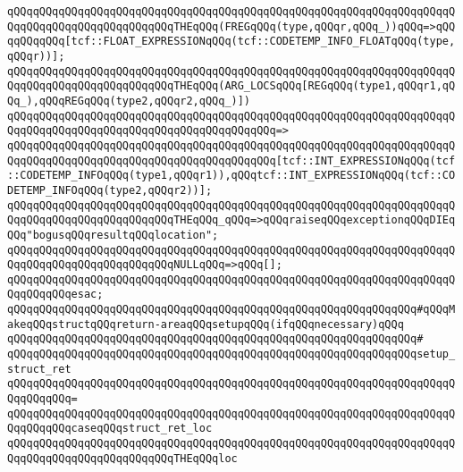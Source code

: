 \verb|qQQqqQQqqQQqqQQqqQQqqQQqqQQqqQQqqQQqqQQqqQQqqQQqqQQqqQQqqQQqqQQqqQQqqQQqqQQqqQQqqQQqqQQqqQQqqQQqTHEqQQq(FREGqQQq(type,qQQqr,qQQq_))qQQq=>qQQqqQQqqQQq[tcf::FLOAT_EXPRESSIONqQQq(tcf::CODETEMP_INFO_FLOATqQQq(type,qQQqr))];|\newline
\newline
\verb|qQQqqQQqqQQqqQQqqQQqqQQqqQQqqQQqqQQqqQQqqQQqqQQqqQQqqQQqqQQqqQQqqQQqqQQqqQQqqQQqqQQqqQQqqQQqqQQqTHEqQQq(ARG_LOCSqQQq[REGqQQq(type1,qQQqr1,qQQq_),qQQqREGqQQq(type2,qQQqr2,qQQq_)])|\newline
\verb|qQQqqQQqqQQqqQQqqQQqqQQqqQQqqQQqqQQqqQQqqQQqqQQqqQQqqQQqqQQqqQQqqQQqqQQqqQQqqQQqqQQqqQQqqQQqqQQqqQQqqQQqqQQqqQQq=>|\newline
\verb|qQQqqQQqqQQqqQQqqQQqqQQqqQQqqQQqqQQqqQQqqQQqqQQqqQQqqQQqqQQqqQQqqQQqqQQqqQQqqQQqqQQqqQQqqQQqqQQqqQQqqQQqqQQqqQQq[tcf::INT_EXPRESSIONqQQq(tcf::CODETEMP_INFOqQQq(type1,qQQqr1)),qQQqtcf::INT_EXPRESSIONqQQq(tcf::CODETEMP_INFOqQQq(type2,qQQqr2))];|\newline
\newline
\verb|qQQqqQQqqQQqqQQqqQQqqQQqqQQqqQQqqQQqqQQqqQQqqQQqqQQqqQQqqQQqqQQqqQQqqQQqqQQqqQQqqQQqqQQqqQQqqQQqTHEqQQq_qQQq=>qQQqraiseqQQqexceptionqQQqDIEqQQq"bogusqQQqresultqQQqlocation";|\newline
\newline
\verb|qQQqqQQqqQQqqQQqqQQqqQQqqQQqqQQqqQQqqQQqqQQqqQQqqQQqqQQqqQQqqQQqqQQqqQQqqQQqqQQqqQQqqQQqqQQqqQQqNULLqQQq=>qQQq[];|\newline
\verb|qQQqqQQqqQQqqQQqqQQqqQQqqQQqqQQqqQQqqQQqqQQqqQQqqQQqqQQqqQQqqQQqqQQqqQQqqQQqqQQqesac;|\newline
\newline
\newline
\verb|qQQqqQQqqQQqqQQqqQQqqQQqqQQqqQQqqQQqqQQqqQQqqQQqqQQqqQQqqQQqqQQq#qQQqMakeqQQqstructqQQqreturn-areaqQQqsetupqQQq(ifqQQqnecessary)qQQq|\newline
\verb|qQQqqQQqqQQqqQQqqQQqqQQqqQQqqQQqqQQqqQQqqQQqqQQqqQQqqQQqqQQqqQQq#|\newline
\verb|qQQqqQQqqQQqqQQqqQQqqQQqqQQqqQQqqQQqqQQqqQQqqQQqqQQqqQQqqQQqqQQqsetup_struct_ret|\newline
\verb|qQQqqQQqqQQqqQQqqQQqqQQqqQQqqQQqqQQqqQQqqQQqqQQqqQQqqQQqqQQqqQQqqQQqqQQqqQQqqQQq=|\newline
\verb|qQQqqQQqqQQqqQQqqQQqqQQqqQQqqQQqqQQqqQQqqQQqqQQqqQQqqQQqqQQqqQQqqQQqqQQqqQQqqQQqcaseqQQqstruct_ret_loc|\newline
\newline
\verb|qQQqqQQqqQQqqQQqqQQqqQQqqQQqqQQqqQQqqQQqqQQqqQQqqQQqqQQqqQQqqQQqqQQqqQQqqQQqqQQqqQQqqQQqqQQqqQQqTHEqQQqloc|\newline
